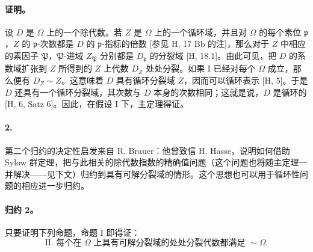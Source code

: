 \paragraph{证明。}
设 \(D\) 是 \(\Omega\) 上的一个除代数。若 \(Z\) 是 \(\Omega\) 上的一个循环域，并且对 \(\Omega\) 的每个素位 \(\mathfrak p\)，\(Z\) 的 \(\mathfrak p\)-次数都是 \(D\) 的 \(\mathfrak p\)-指标的倍数 [参见 H, 17 Bb 的注]，那么对于 \(Z\) 中相应的素因子 \(\mathfrak P\)，\(\mathfrak P\)-进域 \(Z_{\mathfrak P}\) 分别都是 \(D_{\mathfrak p}\) 的分裂域 [H, 18.1]。由此可见，把 \(D\) 的系数域扩张到 \(Z\) 所得到的 \(Z\) 上代数 \(D_Z\) 处处分裂。如果 I 已经对每个 \(\Omega\) 成立，那么便有 \(D_Z\sim Z\)。这意味着 \(D\) 具有循环分裂域 \(Z\)，因而可以循环表示 [H, 5]。于是 \(D\) 还具有一个循环分裂域，其次数与 \(D\) 本身的次数相同；这就是说，\(D\) 是循环的 [H, 6, Satz 6]。因此，在假设 I 下，主定理得证。

\paragraph{2.}
第二个归约的决定性启发来自 R. Brauer：他曾致信 H. Hasse，说明如何借助 Sylow 群定理，把与此相关的除代数指数的精确值问题（这个问题也将随主定理一并解决——见下文）归约到具有可解分裂域的情形。这个思想也可以用于循环性问题的相应进一步归约。

\paragraph{归约 2。}
只要证明下列命题，命题 I 即得证：
\[
\text{II. 每个在 }\Omega\text{ 上具有可解分裂域的处处分裂代数都满足 }\sim\Omega .
\]

